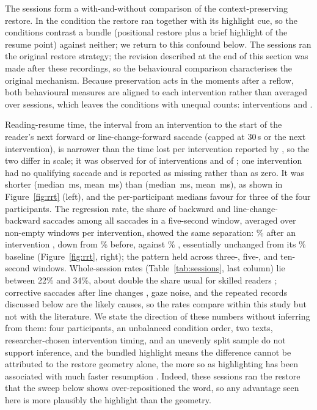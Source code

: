 The \sessionsN{} sessions form a with-and-without comparison of the context-preserving restore.
In the \on{} condition the restore ran together with its highlight cue, so the conditions contrast a bundle (positional restore plus a brief highlight of the resume point) against neither; we return to this confound below.
The \on{} sessions ran the original restore strategy; the revision described at the end of this section was made after these recordings, so the behavioural comparison characterises the original mechanism.
Because preservation acts in the moments after a reflow, both behavioural measures are aligned to each intervention rather than averaged over sessions, which leaves the conditions with unequal counts: \interventionsWith{} interventions \on{} and \interventionsWithout{} \off{}.

Reading-resume time, the interval from an intervention to the start of the reader's next forward or line-change-forward saccade (capped at 30\,s or the next intervention), is narrower than the time lost per intervention reported by \citet{jensen2025context}, so the two differ in scale; it was observed for \rrtWithObserved{} of \interventionsWith{} interventions \on{} and \rrtWithoutObserved{} of \interventionsWithout{} \off{}; one \off{} intervention had no qualifying saccade and is reported as missing rather than as zero.
It was shorter \on{} (median \rrtWithMedian{}\,ms, mean \rrtWithMean{}\,ms) than \off{} (median \rrtWithoutMedian{}\,ms, mean \rrtWithoutMean{}\,ms), as shown in Figure~\ref{fig:rrt} (left), and the per-participant medians favour \on{} for three of the four participants.
The regression rate, the share of backward and line-change-backward saccades among all saccades in a five-second window, averaged over non-empty windows per intervention, showed the same separation: \regWithPost\% after an intervention \on{}, down from \regWithPre\% before, against \regWithoutPost\% \off{}, essentially unchanged from its \regWithoutPre\% baseline (Figure~\ref{fig:rrt}, right); the pattern held across three-, five-, and ten-second windows.
Whole-session rates (Table~\ref{tab:sessions}, last column) lie between 22\% and 34\%, about double the share usual for skilled readers \cite{rayner1998eyemovements}; corrective saccades after line changes \cite{parker2019returnsweep}, gaze noise, and the repeated records discussed below are the likely causes, so the rates compare within this study but not with the literature.
We state the direction of these numbers without inferring from them: four participants, an unbalanced condition order, two texts, researcher-chosen intervention timing, and an unevenly split sample do not support inference, and the bundled highlight means the difference cannot be attributed to the restore geometry alone, the more so as highlighting has been associated with much faster resumption \cite{jensen2025context}.
Indeed, these sessions ran the restore that the sweep below shows over-repositioned the word, so any advantage seen here is more plausibly the highlight than the geometry.

